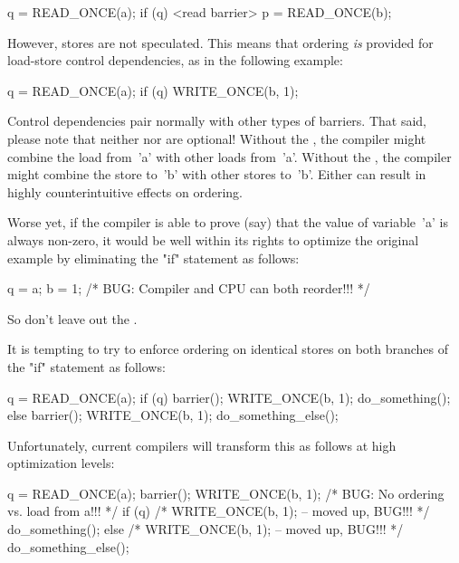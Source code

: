 \begin{VerbatimU}
	q = READ_ONCE(a);
	if (q) {
		<read barrier>
		p = READ_ONCE(b);
	}
\end{VerbatimU}

However, stores are not speculated.
This means that ordering \emph{is} provided for load-store control
dependencies, as in the following example:

\begin{VerbatimU}
	q = READ_ONCE(a);
	if (q) {
		WRITE_ONCE(b, 1);
	}
\end{VerbatimU}

Control dependencies pair normally with other types of barriers.
That said, please note that neither  nor 
are optional!
Without the , the compiler might combine the
load from~'a' with other loads from~'a'.  Without the ,
the compiler might combine the store to~'b' with other stores to~'b'.
Either can result in highly counterintuitive effects on ordering.

Worse yet, if the compiler is able to prove (say) that the value of
variable~'a' is always non-zero, it would be well within its rights
to optimize the original example by eliminating the "if" statement
as follows:

\begin{VerbatimU}
	q = a;
	b = 1;  /* BUG: Compiler and CPU can both reorder!!! */
\end{VerbatimU}

So don't leave out the .

It is tempting to try to enforce ordering on identical stores on both
branches of the "if" statement as follows:

\begin{VerbatimU}
	q = READ_ONCE(a);
	if (q) {
		barrier();
		WRITE_ONCE(b, 1);
		do_something();
	} else {
		barrier();
		WRITE_ONCE(b, 1);
		do_something_else();
	}
\end{VerbatimU}

Unfortunately, current compilers will transform this as follows at high
optimization levels:

\begin{VerbatimU}
	q = READ_ONCE(a);
	barrier();
	WRITE_ONCE(b, 1);  /* BUG: No ordering vs. load from a!!! */
	if (q) {
		/* WRITE_ONCE(b, 1); -- moved up, BUG!!! */
		do_something();
	} else {
		/* WRITE_ONCE(b, 1); -- moved up, BUG!!! */
		do_something_else();
	}
\end{VerbatimU}

